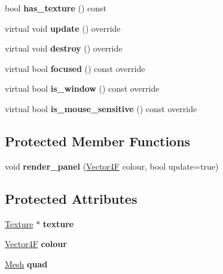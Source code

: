 \begin{DoxyCompactItemize}
\item 
\mbox{\label{class_panel_a3df9165a8d21073e92090937122a790b}} 
bool {\bfseries has\+\_\+texture} () const
\item 
\mbox{\label{class_panel_a9e9c0608cf3139833cde6b73dc3ba443}} 
virtual void {\bfseries update} () override
\item 
\mbox{\label{class_panel_ac21884693c47ee069feb9e963f00e9af}} 
virtual void {\bfseries destroy} () override
\item 
\mbox{\label{class_panel_ace2217419ea5c2e98a38678c6e2012e1}} 
virtual bool {\bfseries focused} () const override
\item 
\mbox{\label{class_panel_a9a30fff40fad1f0845c0c7aa2786f772}} 
virtual bool {\bfseries is\+\_\+window} () const override
\item 
\mbox{\label{class_panel_a607fe6e1be6fd056f199fa817a4dedda}} 
virtual bool {\bfseries is\+\_\+mouse\+\_\+sensitive} () const override
\end{DoxyCompactItemize}
\subsection*{Protected Member Functions}
\begin{DoxyCompactItemize}
\item 
\mbox{\label{class_panel_a9f81e58fd5b3d441a145d3aa5e222293}} 
void {\bfseries render\+\_\+panel} (\mbox{\hyperlink{class_vector4}{Vector4F}} colour, bool update=true)
\end{DoxyCompactItemize}
\subsection*{Protected Attributes}
\begin{DoxyCompactItemize}
\item 
\mbox{\label{class_panel_a682c2d8747451954095eb567b45d3fbd}} 
\mbox{\hyperlink{class_texture}{Texture}} $\ast$ {\bfseries texture}
\item 
\mbox{\label{class_panel_a7c38e08ad80eb9972428450fb639bf66}} 
\mbox{\hyperlink{class_vector4}{Vector4F}} {\bfseries colour}
\item 
\mbox{\label{class_panel_a3567eff819cd864ee8b6cbce5c01b274}} 
\mbox{\hyperlink{class_mesh}{Mesh}} {\bfseries quad}
\end{DoxyCompactItemize}



